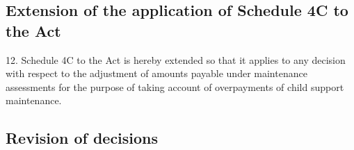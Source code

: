 \documentclass[12pt,a4paper]{article}
\begin{document}
%
%
%
%
%
%
%
%


\subsection[12. Extension of the application of Schedule 4C to the Act]{Extension of the application of Schedule 4C to the Act}

12.  Schedule 4C to the Act is hereby extended so that it applies to any decision with respect to the adjustment of amounts payable under maintenance assessments for the purpose of taking account of overpayments of child support maintenance.


\subsection[13. Revision of decisions]{Revision of decisions}
\end{document}
